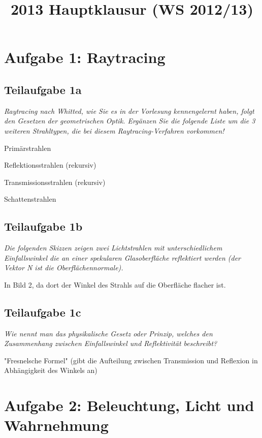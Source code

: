 \documentclass[a4paper]{scrartcl}
\begin{document}
\title{2013 Hauptklausur (WS 2012/13)}

\setcounter{section}{1}
\section*{Aufgabe 1: Raytracing}
\subsection*{Teilaufgabe 1a}
\textit{Raytracing nach Whitted, wie Sie es in der Vorlesung kennengelernt
haben, folgt den Gesetzen der geometrischen Optik. Ergänzen Sie die folgende
Liste um die 3 weiteren Strahltypen, die bei diesem Raytracing-Verfahren
vorkommen!}

\begin{enumerate*}[label=(\arabic*)]
    \item Primärstrahlen
    \item Reflektionsstrahlen (rekursiv)
    \item Transmissionsstrahlen (rekursiv)
    \item Schattenstrahlen
\end{enumerate*}

\subsection*{Teilaufgabe 1b}
\textit{Die folgenden Skizzen zeigen zwei Lichtstrahlen mit unterschiedlichem
Einfallswinkel die an einer spekularen Glasoberfläche reflektiert werden (der
Vektor N ist die Oberflächennormale).}

In Bild 2, da dort der Winkel des Strahls auf die Oberfläche flacher ist.

\subsection*{Teilaufgabe 1c}
\textit{Wie nennt man das physikalische Gesetz oder Prinzip, welches den
Zusammenhang zwischen Einfallswinkel und Reflektivität beschreibt?}

"Fresnelsche Formel" (gibt die Aufteilung zwischen Transmission und Reflexion in Abhängigkeit des Winkels an)

\clearpage
\section*{Aufgabe 2: Beleuchtung, Licht und Wahrnehmung}
\end{document}
